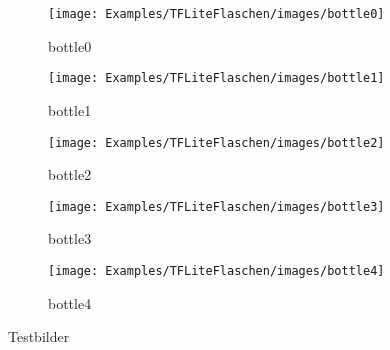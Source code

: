 \begin{figure} [H]
	    \begin{subfigure}{0.19\textwidth}
    \centering
	\texttt{[image: Examples/TFLiteFlaschen/images/bottle0]}
	\caption{bottle0}
	\end{subfigure}
	\begin{subfigure}{0.19\textwidth}
    \centering
	\texttt{[image: Examples/TFLiteFlaschen/images/bottle1]}
	\caption{bottle1}
	\end{subfigure}
	\begin{subfigure}{0.19\textwidth}
    \centering
	\texttt{[image: Examples/TFLiteFlaschen/images/bottle2]}
	\caption{bottle2}
	\end{subfigure}
	\begin{subfigure}{0.19\textwidth}
    \centering
	\texttt{[image: Examples/TFLiteFlaschen/images/bottle3]}
	\caption{bottle3}
	\end{subfigure}
	\begin{subfigure}{0.19\textwidth}
    \centering
	\texttt{[image: Examples/TFLiteFlaschen/images/bottle4]}
	\caption{bottle4}
	\end{subfigure}
\caption{Testbilder}
\label{FigTestbilder}
\end{figure}


